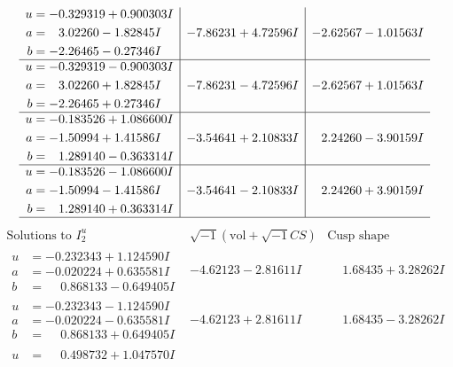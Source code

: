 \documentclass[1p]{elsarticle_modified}
\theoremstyle{definition}
\newcommand{\I}{\sqrt{-1}}
\begin{document}
$$\begin{array}{c|c|c}
\begin{aligned}
u &= -0.329319 + 0.900303 I \\
a &= \phantom{-}3.02260 - 1.82845 I \\
b &= -2.26465 - 0.27346 I\end{aligned}
 & -7.86231 + 4.72596 I & -2.62567 - 1.01563 I \\ \hline\begin{aligned}
u &= -0.329319 - 0.900303 I \\
a &= \phantom{-}3.02260 + 1.82845 I \\
b &= -2.26465 + 0.27346 I\end{aligned}
 & -7.86231 - 4.72596 I & -2.62567 + 1.01563 I \\ \hline\begin{aligned}
u &= -0.183526 + 1.086600 I \\
a &= -1.50994 + 1.41586 I \\
b &= \phantom{-}1.289140 - 0.363314 I\end{aligned}
 & -3.54641 + 2.10833 I & \phantom{-}2.24260 - 3.90159 I \\ \hline\begin{aligned}
u &= -0.183526 - 1.086600 I \\
a &= -1.50994 - 1.41586 I \\
b &= \phantom{-}1.289140 + 0.363314 I\end{aligned}
 & -3.54641 - 2.10833 I & \phantom{-}2.24260 + 3.90159 I\\
 \hline 
 \end{array}$$\newpage$$\begin{array}{c|c|c}  
\text{Solutions to }I^u_{2}& \I (\text{vol} + \sqrt{-1}CS) & \text{Cusp shape}\\
 \hline 
\begin{aligned}
u &= -0.232343 + 1.124590 I \\
a &= -0.020224 + 0.635581 I \\
b &= \phantom{-}0.868133 - 0.649405 I\end{aligned}
 & -4.62123 - 2.81611 I & \phantom{-}1.68435 + 3.28262 I \\ \hline\begin{aligned}
u &= -0.232343 - 1.124590 I \\
a &= -0.020224 - 0.635581 I \\
b &= \phantom{-}0.868133 + 0.649405 I\end{aligned}
 & -4.62123 + 2.81611 I & \phantom{-}1.68435 - 3.28262 I \\ \hline\begin{aligned}
u &= \phantom{-}0.498732 + 1.047570 I \\

\end{aligned}
\end{array}$$
\end{document}

